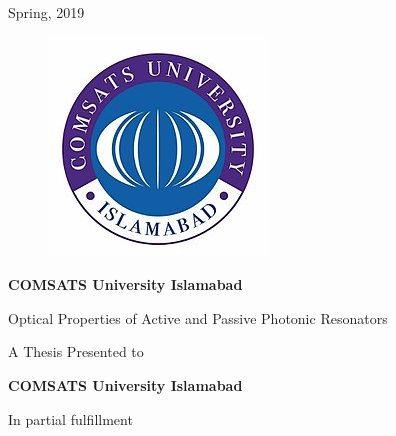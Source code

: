 \documentclass[12pt,twoside]{report}
\begin{document}
	\begin{center}
		 Spring, 2019
	\end{center}
	\newpage
	\noindent
	\begin{figure}
		\centering
		\includegraphics[width=1\linewidth]{university.jpg}
	\end{figure}
	\begin{center}
	{\Large{ \textbf{COMSATS University Islamabad}}}
	\end{center}
	
	\vspace{0.2 in}
	
	\begin{center}
		{\Large {Optical Properties of Active and Passive Photonic Resonators
		} }
	\end{center}
	\vspace{0.5 in}
	
	\begin{center}
	{A Thesis Presented to}
	\end{center}
	\vspace{0.2 in}
	\begin{center}
		{\Large {\textbf{COMSATS University Islamabad}} }
	\end{center}
	\vspace{0.5 in}
	\begin{center}
		{In partial fulfillment }
	\end{center}
\end{document}
